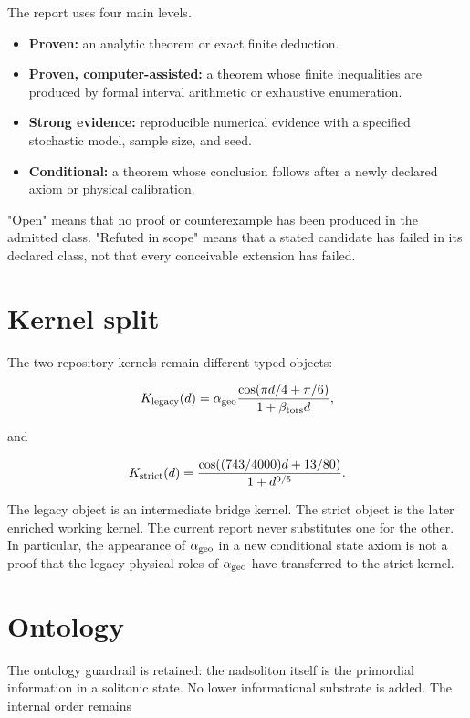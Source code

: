 \documentclass[11pt,a4paper,openany]{report}
\begin{document}
The report uses four main levels.

\begin{itemize}
\item 
\textbf{Proven:} an analytic theorem or exact finite deduction.

\item 
\textbf{Proven, computer-assisted:} a theorem whose finite inequalities are produced by formal interval arithmetic or exhaustive enumeration.

\item 
\textbf{Strong evidence:} reproducible numerical evidence with a specified stochastic model, sample size, and seed.

\item 
\textbf{Conditional:} a theorem whose conclusion follows after a newly declared axiom or physical calibration.

\end{itemize}

"Open" means that no proof or counterexample has been produced in the admitted class. "Refuted in scope" means that a stated candidate has failed in its declared class, not that every conceivable extension has failed.

\section{Kernel split}

The two repository kernels remain different typed objects:

\[
K_{\rm legacy}(d)
=
\alpha_{\rm geo}
\frac{\cos(\pi d/4+\pi/6)}
{1+\beta_{\rm tors}d},
\]

and

\[
K_{\rm strict}(d)
=
\frac{\cos((743/4000)d+13/80)}
{1+d^{9/5}}.
\]

The legacy object is an intermediate bridge kernel. The strict object is the later enriched working kernel. The current report never substitutes one for the other. In particular, the appearance of \(\alpha_{\rm geo}\) in a new conditional state axiom is not a proof that the legacy physical roles of \(\alpha_{\rm geo}\) have transferred to the strict kernel.

\section{Ontology}

The ontology guardrail is retained: the nadsoliton itself is the primordial information in a solitonic state. No lower informational substrate is added. The internal order remains
\end{document}
